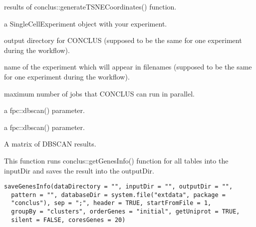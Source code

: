 \documentclass[a4paper]{book}
\begin{document}
\begin{Arguments}
\begin{ldescription}
\item[\code{tSNEResults}] results of conclus::generateTSNECoordinates() function.

\item[\code{sceObject}] a SingleCellExperiment object with your experiment.

\item[\code{dataDirectory}] output directory for CONCLUS (supposed to be the same for one experiment during the workflow).

\item[\code{experimentName}] name of the experiment which will appear in filenames 
(supposed to be the same for one experiment during the workflow).

\item[\code{cores}] maximum number of jobs that CONCLUS can run in parallel.

\item[\code{epsilon}] a fpc::dbscan() parameter.

\item[\code{minPoints}] a fpc::dbscan() parameter.
\end{ldescription}
\end{Arguments}
%
\begin{Value}
A matrix of DBSCAN results.
\end{Value}
%
\begin{Description}\relax
This function runs conclus::getGenesInfo() function for all tables into the inputDir 
and saves the result into the outputDir.
\end{Description}
%
\begin{Usage}
\begin{verbatim}
saveGenesInfo(dataDirectory = "", inputDir = "", outputDir = "",
  pattern = "", databaseDir = system.file("extdata", package =
  "conclus"), sep = ";", header = TRUE, startFromFile = 1,
  groupBy = "clusters", orderGenes = "initial", getUniprot = TRUE,
  silent = FALSE, coresGenes = 20)
\end{verbatim}
\end{Usage}
%
\end{document}

